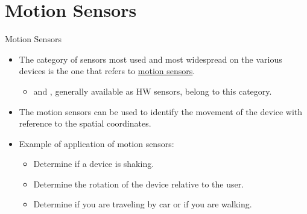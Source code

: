 \documentclass{beamer}
\begin{document}
\section{Motion Sensors}

  \begin{frame}{Motion Sensors}
    \begin{itemize}\itemsep10pt
      \item The category of sensors most used and most widespread on the various
      devices is the one that refers to \underline{motion sensors}.
      \begin{itemize}
        \item {} and , generally available as
        HW sensors, belong to this category.
      \end{itemize}
      \item The motion sensors can be used to identify the movement of the
      device with reference to the spatial coordinates.
      \item Example of application of motion sensors:
      \begin{itemize}
        \item Determine if a device is shaking.
        \item Determine the rotation of the device relative to the user.
        \item Determine if you are traveling by car or if you are walking. 
      \end{itemize}
    \end{itemize}
  \end{frame}
\end{document}
